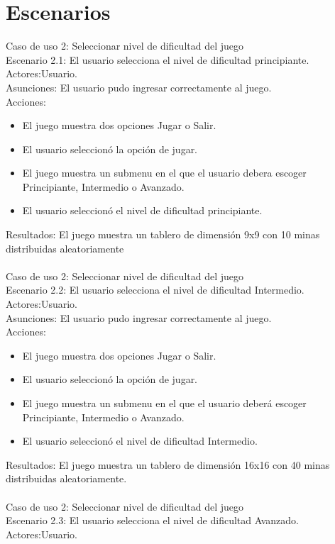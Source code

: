 \documentclass[11pt]{article} %
\begin{document}
\section{Escenarios}
Caso de uso 2: Seleccionar nivel de dificultad del juego
\\Escenario 2.1: El usuario selecciona el nivel de dificultad principiante.\
\\Actores:Usuario.\
\\Asunciones: El usuario pudo ingresar correctamente al juego.\
\\Acciones:\
\begin{itemize}
\item El juego muestra dos opciones Jugar o Salir.
\item El usuario seleccionó la opción de jugar.
\item El juego muestra un submenu en el que el usuario debera escoger Principiante, Intermedio o Avanzado.
\item El usuario seleccionó el nivel de dificultad principiante.
\end {itemize}
Resultados:
El juego muestra un tablero de dimensión 9x9 con 10 minas distribuidas aleatoriamente
\\   \
\\Caso de uso 2: Seleccionar nivel de dificultad del juego\
\\Escenario 2.2: El usuario selecciona el nivel de dificultad Intermedio.\
\\Actores:Usuario.\
\\Asunciones: El usuario pudo ingresar correctamente al juego.\
\\Acciones:\
\begin{itemize}
\item El juego muestra dos opciones Jugar o Salir.
\item El usuario seleccionó la opción de jugar.
\item El juego muestra un submenu en el que el usuario deberá escoger Principiante, Intermedio o Avanzado.
\item El usuario seleccionó el nivel de dificultad Intermedio.
\end {itemize}
Resultados:
El juego muestra un tablero de dimensión 16x16 con 40 minas distribuidas aleatoriamente.
\\ \
\\Caso de uso 2: Seleccionar nivel de dificultad del juego\
\\Escenario 2.3: El usuario selecciona el nivel de dificultad Avanzado.\
\\Actores:Usuario.\
\end{document}
